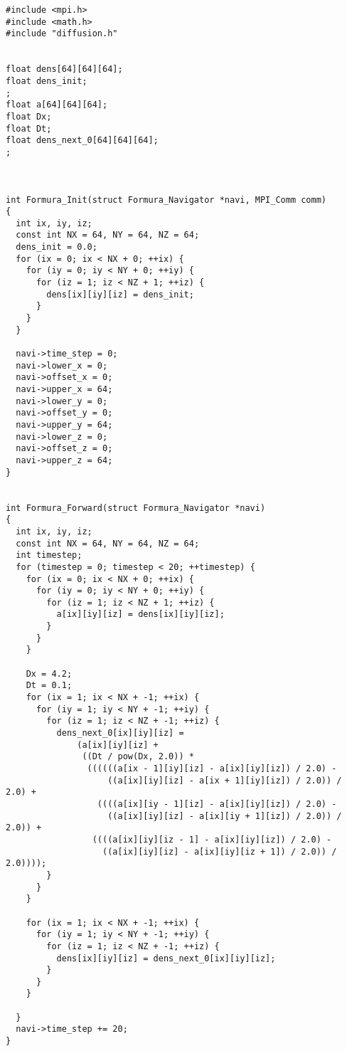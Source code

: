 \begin{breakbox}
\begin{verbatim}
#include <mpi.h>
#include <math.h>
#include "diffusion.h"


float dens[64][64][64];
float dens_init;
;
float a[64][64][64];
float Dx;
float Dt;
float dens_next_0[64][64][64];
;



int Formura_Init(struct Formura_Navigator *navi, MPI_Comm comm)
{
  int ix, iy, iz;
  const int NX = 64, NY = 64, NZ = 64;
  dens_init = 0.0;
  for (ix = 0; ix < NX + 0; ++ix) {
    for (iy = 0; iy < NY + 0; ++iy) {
      for (iz = 1; iz < NZ + 1; ++iz) {
        dens[ix][iy][iz] = dens_init;
      }
    }
  }

  navi->time_step = 0;
  navi->lower_x = 0;
  navi->offset_x = 0;
  navi->upper_x = 64;
  navi->lower_y = 0;
  navi->offset_y = 0;
  navi->upper_y = 64;
  navi->lower_z = 0;
  navi->offset_z = 0;
  navi->upper_z = 64;
}


int Formura_Forward(struct Formura_Navigator *navi)
{
  int ix, iy, iz;
  const int NX = 64, NY = 64, NZ = 64;
  int timestep;
  for (timestep = 0; timestep < 20; ++timestep) {
    for (ix = 0; ix < NX + 0; ++ix) {
      for (iy = 0; iy < NY + 0; ++iy) {
        for (iz = 1; iz < NZ + 1; ++iz) {
          a[ix][iy][iz] = dens[ix][iy][iz];
        }
      }
    }

    Dx = 4.2;
    Dt = 0.1;
    for (ix = 1; ix < NX + -1; ++ix) {
      for (iy = 1; iy < NY + -1; ++iy) {
        for (iz = 1; iz < NZ + -1; ++iz) {
          dens_next_0[ix][iy][iz] =
              (a[ix][iy][iz] +
               ((Dt / pow(Dx, 2.0)) *
                ((((((a[ix - 1][iy][iz] - a[ix][iy][iz]) / 2.0) -
                    ((a[ix][iy][iz] - a[ix + 1][iy][iz]) / 2.0)) / 2.0) +
                  ((((a[ix][iy - 1][iz] - a[ix][iy][iz]) / 2.0) -
                    ((a[ix][iy][iz] - a[ix][iy + 1][iz]) / 2.0)) / 2.0)) +
                 ((((a[ix][iy][iz - 1] - a[ix][iy][iz]) / 2.0) -
                   ((a[ix][iy][iz] - a[ix][iy][iz + 1]) / 2.0)) / 2.0))));
        }
      }
    }

    for (ix = 1; ix < NX + -1; ++ix) {
      for (iy = 1; iy < NY + -1; ++iy) {
        for (iz = 1; iz < NZ + -1; ++iz) {
          dens[ix][iy][iz] = dens_next_0[ix][iy][iz];
        }
      }
    }

  }
  navi->time_step += 20;
}
\end{verbatim}
\end{breakbox}
